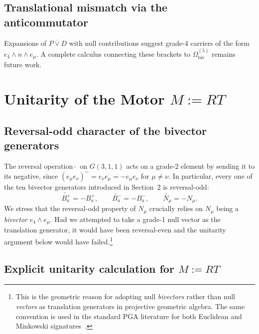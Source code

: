 \documentclass[dvipdfmx,a4paper]{article}
\theoremstyle{definition}
\theoremstyle{plain}
\theoremstyle{remark}
\begin{document}
\subsection{Translational mismatch via the anticommutator}

Expansions of \(P\mathbin{\overline{\vee}}D\) with null contributions suggest grade-4 carriers of the form \(e_{4}\wedge n\wedge e_{\mu}\). A complete calculus connecting these brackets to \(\Omega_{\text{biv}}^{(5)}\) remains future work.

\section{Unitarity of the Motor \(M:=RT\)}

\subsection{Reversal-odd character of the bivector generators}

The reversal operation \(\,\tilde{}\,\) on \(G(3,1,1)\) acts on a grade-2 element by sending it to its negative, since \((e_{\mu}e_{\nu})^{\sim} = e_{\nu}e_{\mu} = -e_{\mu}e_{\nu}\) for \(\mu\neq\nu\). In particular, every one of the ten bivector generators introduced in Section~2 is reversal-odd:
\begin{equation}
\widetilde{B_{a}^{+}} = -B_{a}^{+},\qquad
\widetilde{B_{a}^{-}} = -B_{a}^{-},\qquad
\widetilde{N_{\mu}}   = -N_{\mu}.
\label{eq:rev-odd}
\end{equation}
We stress that the reversal-odd property of \(N_{\mu}\) crucially relies on \(N_{\mu}\) being a \emph{bivector} \(e_{4}\wedge e_{\mu}\). Had we attempted to take a grade-1 null vector as the translation generator, it would have been reversal-even and the unitarity argument below would have failed.\footnote{This is the geometric reason for adopting null \emph{bivectors} rather than null \emph{vectors} as translation generators in projective geometric algebra. The same convention is used in the standard PGA literature for both Euclidean and Minkowski signatures~\cite{Gunn2017,Lengyel2024,GunnDeKeninck2020}.}

\subsection{Explicit unitarity calculation for \(M:=RT\)}
\end{document}
